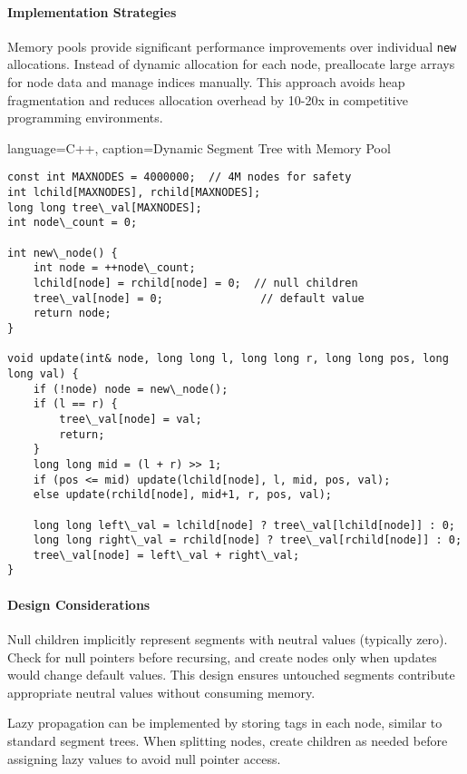 \paragraph{Implementation Strategies}

Memory pools provide significant performance improvements over individual \texttt{new} allocations. Instead of dynamic allocation for each node, preallocate large arrays for node data and manage indices manually. This approach avoids heap fragmentation and reduces allocation overhead by 10-20x in competitive programming environments.

\begin{marginlisting}[0pt]{language=C++, caption=Dynamic Segment Tree with Memory Pool}
\begin{lstlisting}
const int MAXNODES = 4000000;  // 4M nodes for safety
int lchild[MAXNODES], rchild[MAXNODES];
long long tree\_val[MAXNODES];
int node\_count = 0;

int new\_node() {
    int node = ++node\_count;
    lchild[node] = rchild[node] = 0;  // null children
    tree\_val[node] = 0;               // default value
    return node;
}

void update(int& node, long long l, long long r, long long pos, long long val) {
    if (!node) node = new\_node();
    if (l == r) {
        tree\_val[node] = val;
        return;
    }
    long long mid = (l + r) >> 1;
    if (pos <= mid) update(lchild[node], l, mid, pos, val);
    else update(rchild[node], mid+1, r, pos, val);
    
    long long left\_val = lchild[node] ? tree\_val[lchild[node]] : 0;
    long long right\_val = rchild[node] ? tree\_val[rchild[node]] : 0;
    tree\_val[node] = left\_val + right\_val;
}
\end{lstlisting}
\end{marginlisting}

\paragraph{Design Considerations}

Null children implicitly represent segments with neutral values (typically zero). Check for null pointers before recursing, and create nodes only when updates would change default values. This design ensures untouched segments contribute appropriate neutral values without consuming memory.

Lazy propagation can be implemented by storing tags in each node, similar to standard segment trees. When splitting nodes, create children as needed before assigning lazy values to avoid null pointer access.

